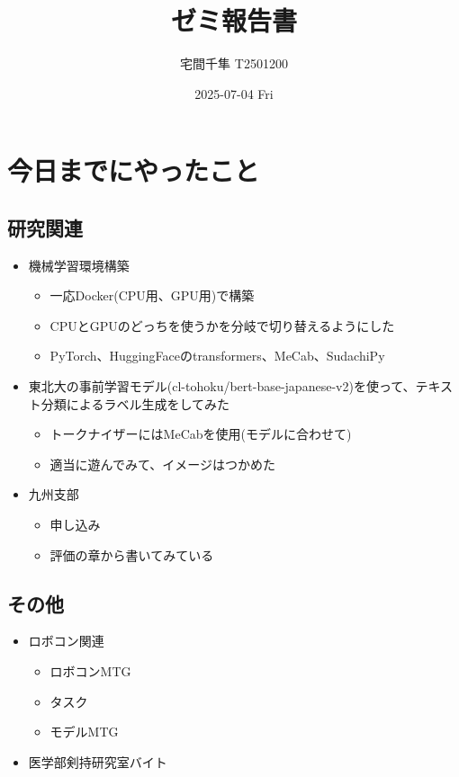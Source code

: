 \documentclass[uplatex, onecolumn, 10pt]{jsarticle}
\begin{document}
\title{\vspace{-40mm}\bf{\LARGE{ゼミ報告書}}}
\author{\vspace{-40mm}宅間千隼 T2501200}
\date{2025-07-04 Fri}
\maketitle


\section{今日までにやったこと}

\subsection*{研究関連} 
\begin{itemize}
	\item 機械学習環境構築
	\begin{itemize}
	\item 一応Docker(CPU用、GPU用)で構築
	\item CPUとGPUのどっちを使うかを分岐で切り替えるようにした
	\item PyTorch、HuggingFaceのtransformers、MeCab、SudachiPy
	\end{itemize}
	\item 東北大の事前学習モデル(cl-tohoku/bert-base-japanese-v2)を使って、テキスト分類によるラベル生成をしてみた
	\begin{itemize}
	\item トークナイザーにはMeCabを使用(モデルに合わせて)
	\item 適当に遊んでみて、イメージはつかめた
	\end{itemize}
	\item 九州支部
	\begin{itemize}
	\item 申し込み
	\item 評価の章から書いてみている
	\end{itemize}
\end{itemize}

\subsection*{その他}
\begin{itemize}
	\item ロボコン関連
	\begin{itemize}
		\item ロボコンMTG
		\item タスク
		\item モデルMTG
	\end{itemize}
	\item 医学部剣持研究室バイト
\end{itemize}
\end{document}
